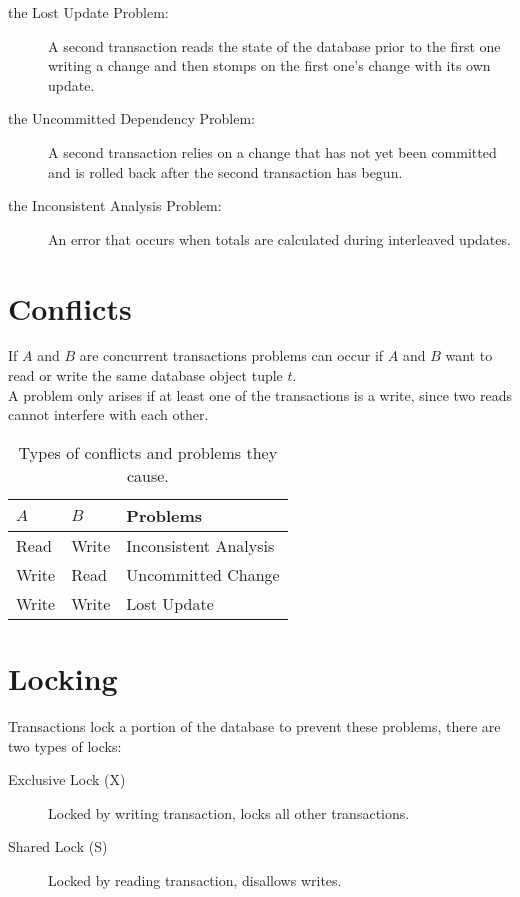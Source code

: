 \documentclass[11pt,a4paper,twocolumn]{book}
\begin{document}
\begin{description}
\item[the Lost Update Problem:] A second transaction reads the state of the database prior to the first one writing a change and then stomps on the first one's change with its own update.
\item[the Uncommitted Dependency Problem:] A second transaction relies on a change that has not yet been committed and is rolled back after the second transaction has begun.
\item[the Inconsistent Analysis Problem:] An error that occurs when totals are calculated during interleaved updates.
\end{description}

\section{Conflicts}

If $A$ and $B$ are concurrent transactions problems can occur if $A$ and $B$ want to read or write the same database object tuple $t$.\\

A problem only arises if at least one of the transactions is a write, since two reads cannot interfere with each other.

\begin{table}
\begin{tabular}{lll}
\toprule
$A$ & $B$ & Problems\\
\midrule
Read & Write & Inconsistent Analysis\\
Write & Read & Uncommitted Change\\
Write & Write & Lost Update\\
\bottomrule
\end{tabular}
\caption{Types of conflicts and problems they cause.}
\label{tab:transactionconflict}
\end{table}

\section{Locking}

Transactions lock a portion of the database to prevent these problems, there are two types of locks:

\begin{description}
\item[Exclusive Lock (X)] Locked by writing transaction, locks all other transactions.
\item[Shared Lock (S)] Locked by reading transaction, disallows writes.
\end{description}
\end{document}

